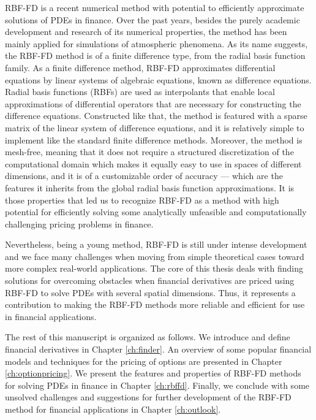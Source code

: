\documentclass{UUThesisTemplate}
\begin{document}
\par
RBF-FD is a recent numerical method with potential to efficiently approximate solutions of PDEs in finance. Over the past years, besides the purely academic development and research of its numerical properties, the method has been mainly applied for simulations of atmospheric phenomena. As its name suggests, the RBF-FD method is of a finite difference type, from the radial basis function family. As a finite difference method, RBF-FD approximates differential equations by linear systems of algebraic equations, known as difference equations. Radial basis functions (RBFs) are used as interpolants that enable local approximations of differential operators that are necessary for constructing the difference equations. Constructed like that, the method is featured with a sparse matrix of the linear system of difference equations, and it is relatively simple to implement like the standard finite difference methods. Moreover, the method is mesh-free, meaning that it does not require a structured discretization of the computational domain which makes it equally easy to use in spaces of different dimensions, and it is of a customizable order of accuracy --- which are the features it inherits from the global radial basis function approximations. It is those properties that led us to recognize RBF-FD as a method with high potential for efficiently solving some analytically unfeasible and computationally challenging pricing problems in finance.

\par
Nevertheless, being a young method, RBF-FD is still under intense development and we face many challenges when moving from simple theoretical cases toward more complex real-world applications. The core of this thesis deals with finding solutions for overcoming obstacles when financial derivatives are priced using RBF-FD to solve PDEs with several spatial dimensions. Thus, it represents a contribution to making the RBF-FD methods more reliable and efficient for use in financial applications. 

\par
The rest of this manuscript is organized as follows. We introduce and define financial derivatives in Chapter \ref{ch:finder}. An overview of some popular financial models and techniques for the pricing of options are presented in Chapter \ref{ch:optionpricing}. We present the features and properties of RBF-FD methods for solving PDEs in finance in Chapter \ref{ch:rbffd}. Finally, we conclude with some unsolved challenges and suggestions for further development of the RBF-FD method for financial applications in Chapter \ref{ch:outlook}.
%
%
\end{document}

